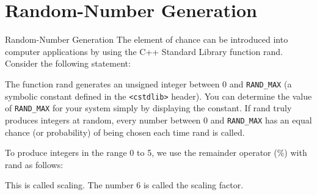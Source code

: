 \documentclass[10pt]{beamer}
\begin{document}
\section{Random-Number Generation}
\begin{frame}{Random-Number Generation}
	The element of chance can be introduced into computer applications by using the
	C++ Standard Library function rand. Consider the following statement:
	
	
	
	The function rand generates an unsigned integer between 0 and \texttt{RAND\_MAX} (a symbolic
	constant defined in the \texttt{<cstdlib>} header). You can determine the value of \texttt{RAND\_MAX} for
	your system simply by displaying the constant. If rand truly produces integers at random,
	every number between 0 and \texttt{RAND\_MAX} has an equal chance (or probability) of being chosen each time rand is called.\\\vspace{10pt}
	
	To produce integers in the range 0 to 5, we use the remainder operator (\%) with rand as follows:
	
	
	
	This is called scaling. The number 6 is called the scaling factor.
\end{frame}

\begin{frame}
	
\end{frame}

\begin{frame}
	
\end{frame}

\begin{frame}
	
\end{frame}

\begin{frame}
	
\end{frame}
\end{document}
